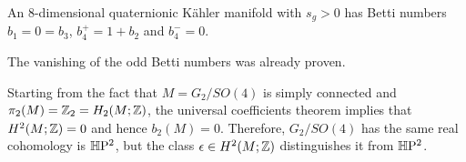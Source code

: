 \documentclass{scrartcl}
\begin{document}
\begin{thm}
	An $8$-dimensional quaternionic K\"ahler manifold with $s_g>0$ has Betti numbers $b_1=0=b_3$, $b_4^+=1+b_2$ and $b_4^-=0$.
\end{thm}
\begin{myproof}
	The vanishing of the odd Betti numbers was already proven.
\end{myproof}

\begin{ex}
	Starting from the fact that $M=G_2/SO(4)$ is simply connected and $\pi_2(M)=\mathbb{Z}_2=H_2(M;\mathbb{Z})$, the universal coefficients theorem implies that $H^2(M;\mathbb{Z})=0$ and hence $b_2(M)=0$. Therefore, $G_2/SO(4)$ has the same real cohomology is $\mathbb{H}\mathrm{P}^2$, but the class $\epsilon\in H^2(M;\mathbb{Z})$ distinguishes it from $\mathbb{H}\mathrm{P}^2$.
\end{ex}
\end{document}
